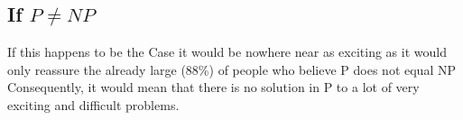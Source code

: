 \documentclass{article}
\begin{document}
	\subsection{If $P \neq NP$}
	If this happens to be the Case it would be nowhere near as exciting as it would only reassure the already large (88\%) of people who believe P does not equal NP \citep{gasarch_2020} Consequently, it would mean that there is no solution in P to a lot of very exciting and difficult problems.
	\newpage
	
	
\end{document}
